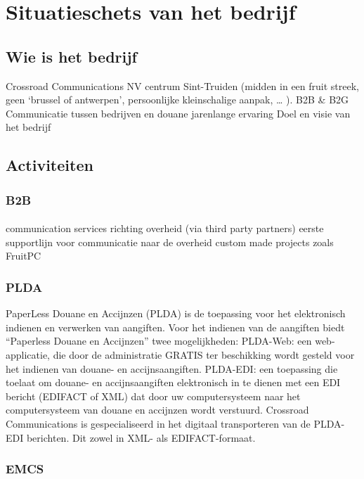 \section {Situatieschets van het bedrijf}

\subsection {Wie is het bedrijf}
Crossroad Communications NV
centrum Sint-Truiden (midden in een fruit streek, geen ‘brussel of antwerpen’,
persoonlijke kleinschalige aanpak, … ).
B2B \& B2G
Communicatie tussen bedrijven en douane
jarenlange ervaring
Doel en visie van het bedrijf


\subsection {Activiteiten}


\subsubsection {B2B}

\paragraph {} communication services richting overheid (via third party partners) eerste
supportlijn voor communicatie naar de overheid custom made projects zoals FruitPC


\subsubsection {PLDA}

PaperLess Douane en Accijnzen (PLDA) is de toepassing voor het elektronisch indienen en
verwerken van aangiften. Voor het indienen van de aangiften biedt “Paperless Douane en
Accijnzen” twee mogelijkheden:
PLDA-Web: een web-applicatie, die door de administratie GRATIS ter beschikking wordt
gesteld voor het indienen van douane- en accijnsaangiften.
PLDA-EDI: een toepassing die toelaat om douane- en accijnsaangiften elektronisch in te
dienen met een EDI bericht (EDIFACT of XML) dat door uw computersysteem naar het
computersysteem van douane en accijnzen wordt verstuurd.
Crossroad Communications is gespecialiseerd in het digitaal transporteren van de PLDA-EDI
berichten. Dit zowel in XML- als EDIFACT-formaat.


\subsubsection {EMCS}


